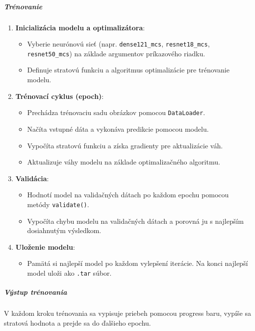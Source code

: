 \documentclass[a4paper, 11pt]{article}
\begin{document}
\subparagraph{Trénovanie}
\begin{enumerate}
    \item \textbf{Inicializácia modelu a optimalizátora}:
    \begin{itemize}
        \item Vyberie neurónovú sieť (napr. \texttt{dense121\_mcs}, \texttt{resnet18\_mcs}, \texttt{resnet50\_mcs}) na základe argumentov príkazového riadku.
        \item Definuje stratovú funkciu a algoritmus optimalizácie pre trénovanie modelu.
    \end{itemize}
    
    \item \textbf{Trénovací cyklus (epoch)}:
    \begin{itemize}
        \item Prechádza trénovaciu sadu obrázkov pomocou \texttt{DataLoader}.
        \item Načíta vstupné dáta a vykonáva predikcie pomocou modelu.
        \item Vypočíta stratovú funkciu a získa gradienty pre aktualizácie váh.
        \item Aktualizuje váhy modelu na základe optimalizačného algoritmu.
    \end{itemize}
    
    \item \textbf{Validácia}:
    \begin{itemize}
        \item Hodnotí model na validačných dátach po každom epochu pomocou metódy \texttt{validate()}.
        \item Vypočíta chybu modelu na validačných dátach a porovná ju s najlepším dosiahnutým výsledkom.
    \end{itemize}
    
    \item \textbf{Uloženie modelu}:
    \begin{itemize}
        \item Pamätá si najlepší model po každom vylepšení iterácie. Na konci najlepší model uloži ako \texttt{.tar} súbor.
    \end{itemize}
\end{enumerate}

\subparagraph{Výstup trénovania}
V každom kroku trénovania sa vypisuje priebeh pomocou {progress baru}, vypíše sa stratová hodnota a prejde sa do ďalšieho epochu.


\vspace{20px}
\end{document}
